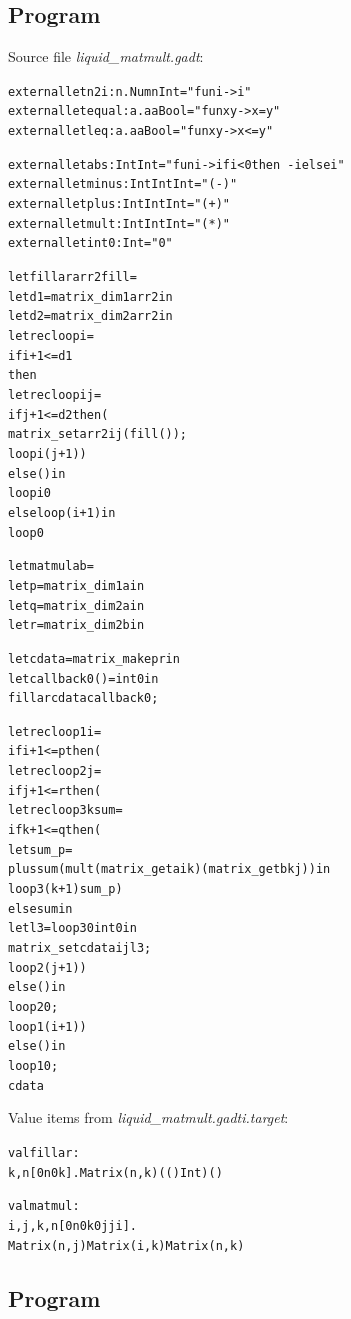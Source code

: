 \documentclass{article}
\newcommand{\tmem}[1]{{\em #1\/}}
\newcommand{\tmverbatim}[1]{{\ttfamily{#1}}}
\newenvironment{tmcode}[1][]{\begin{alltt}}{\end{alltt}}
\begin{document}
\subsection{Program \tmverbatim{matmult}}

Source file {\tmem{liquid\_matmult.gadt}}:
\begin{tmcode}
external let n2i : n. Num n  Int = "fun i -> i"
external let equal : a. a  a  Bool = "fun x y -> x = y"
external let leq : a. a  a  Bool = "fun x y -> x <= y"

external let abs : Int  Int = "fun i -> if i < 0 then ~-i else i"
external let minus : Int  Int  Int = "(-)"
external let plus : Int  Int  Int = "(+)"
external let mult : Int  Int  Int = "( * )"
external let int0 : Int = "0"

let fillar arr2 fill =
  let d1 = matrix_dim1 arr2 in
  let d2 = matrix_dim2 arr2 in
  let rec loop i =
    if i + 1 <= d1 
    then
      let rec loopi j =
        if j + 1 <= d2 then (
          matrix_set arr2 i j (fill ());
          loopi (j + 1))
        else () in
      loopi 0
    else loop (i + 1) in
  loop 0

let matmul a b =
  let p = matrix_dim1 a in
  let q = matrix_dim2 a in
  let r = matrix_dim2 b in

  let cdata = matrix_make p r in
  let callback0 () = int0 in
  fillar cdata callback0;

  let rec loop1 i =
    if i + 1 <= p then (
      let rec loop2 j =
        if j + 1 <= r then (
          let rec loop3 k sum =
            if k + 1 <= q then (
              let sum_p =
                plus sum (mult (matrix_get a i k) (matrix_get b k j)) in
              loop3 (k + 1) sum_p)
            else sum in
          let l3 = loop3 0 int0 in
          matrix_set cdata i j l3;
          loop2 (j + 1))
        else () in
      loop2 0;
      loop1 (i + 1))
    else () in
  loop1 0;
  cdata
\end{tmcode}
Value items from {\tmem{liquid\_matmult.gadti.target}}:
\begin{tmcode}
val fillar :
   k, n[0  n  0  k]. Matrix (n, k)  (()  Int)  ()

val matmul :
   i, j, k, n[0  n  0  k  0  j  j  i].
   Matrix (n, j)  Matrix (i, k)  Matrix (n, k)
\end{tmcode}

\subsection{Program \tmverbatim{heapsort}}
\end{document}
